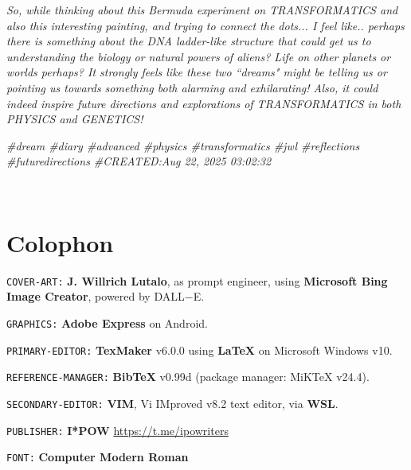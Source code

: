 \documentclass[a4paper, 18pt]{book} %
\newcommand{\comment}[1]{}
\begin{document}
\begin{appendices}
\textit{So, while thinking about this Bermuda experiment on TRANSFORMATICS and also this interesting painting, and trying to connect the dots... I feel like.. perhaps there is something about the DNA ladder-like structure that could get us to understanding the biology or natural powers of aliens? Life on other planets or worlds perhaps? It strongly feels like these two ``dreams" might be telling us or pointing us towards something both alarming and exhilarating! Also, it could indeed inspire future directions and explorations of TRANSFORMATICS in both PHYSICS and GENETICS!}


\textit{\#dream \#diary \#advanced \#physics \#transformatics \#jwl \#reflections \#futuredirections
\#CREATED:Aug 22, 2025 03:02:32}

\Large



\end{appendices}








\vspace{5cm}
\\



\chapter*{Colophon}


\texttt{COVER-ART:} \textbf{J. Willrich Lutalo}, as prompt engineer, using \textbf{Microsoft Bing Image Creator}, powered by DALL$-$E.


\texttt{GRAPHICS:} \textbf{Adobe Express} on Android.


\texttt{PRIMARY-EDITOR:} \textbf{TexMaker} v6.0.0 using \textbf{LaTeX} on Microsoft Windows v10.


\texttt{REFERENCE-MANAGER:} \textbf{BibTeX} v0.99d (package manager: MiKTeX v24.4).


\texttt{SECONDARY-EDITOR:} \textbf{VIM}, Vi IMproved v8.2 text editor, via \textbf{WSL}.


\texttt{PUBLISHER:} \textbf{I*POW} \url{https://t.me/ipowriters}


\texttt{FONT:} \textbf{Computer Modern Roman}


\end{document}
